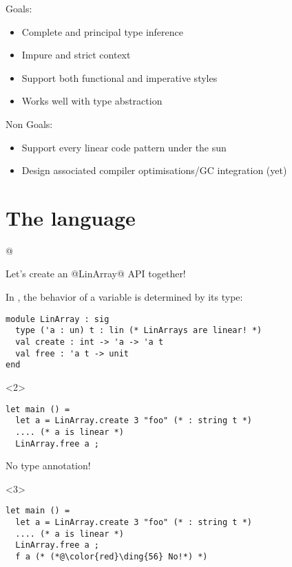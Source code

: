 \documentclass[xcolor=svgnames,11pt]{beamer}
\begin{document}
\begin{frame}
  Goals:
  \begin{itemize}
  \item Complete and principal type inference
  \item Impure and strict context
  \item Support both functional and imperative styles
  \item Works well with type abstraction
  \end{itemize}

  \pause
  Non Goals:
  \begin{itemize}
  \item Support every linear code pattern under the sun
  \item Design associated compiler optimisations/GC integration (yet)
  \end{itemize}
\end{frame}


\section{The \lang language}

\lstMakeShortInline[keepspaces,basicstyle=\small\ttfamily]@


\begin{frame}[t,fragile]

  Let's create an @LinArray@ API together!
  
  In \lang, the behavior of a variable is determined
  by its type:
\begin{lstlisting}
module LinArray : sig
  type ('a : un) t : lin (* LinArrays are linear! *)
  val create : int -> 'a -> 'a t
  val free : 'a t -> unit
end
\end{lstlisting}
\begin{onlyenv}<2>
\begin{lstlisting}
let main () =
  let a = LinArray.create 3 "foo" (* : string t *)
  .... (* a is linear *)
  LinArray.free a ;
\end{lstlisting}

No type annotation!
\end{onlyenv}
\begin{onlyenv}<3>
\begin{lstlisting}
let main () =
  let a = LinArray.create 3 "foo" (* : string t *)
  .... (* a is linear *)
  LinArray.free a ;
  f a (* (*@\color{red}\ding{56} No!*) *)
\end{lstlisting}
\end{onlyenv}

\end{frame}
\end{document}
